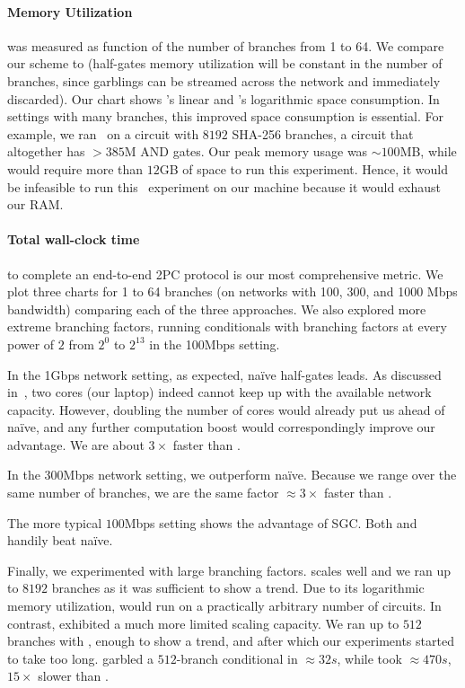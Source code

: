 \paragraph{Memory Utilization} was measured as function of the number
of branches from 1 to 64.
We compare our scheme to \stack (half-gates memory utilization will be
constant in the number of branches, since garblings
can be streamed across the network and immediately discarded).
%
Our chart shows \stack's linear and
\ourschemelong's logarithmic space consumption.
In settings with many branches, this improved space consumption
is essential.
For example, we ran \ourschemelong\ on a circuit
with $8192$ SHA-256 branches, a circuit that altogether has $> 385$M
AND gates.  Our peak memory usage was $\sim 100$MB, while \HK
would require more than $12$GB of space to run this experiment.
Hence, it would be
infeasible to run this \stack\ experiment on our machine because it
would exhaust our RAM.

\paragraph{Total wall-clock time} to complete an end-to-end 2PC
protocol is our most comprehensive metric.
We plot three charts for 1 to 64
branches (on networks with 100, 300, and 1000 Mbps bandwidth) comparing each of the three approaches.
We also explored more extreme branching factors, running conditionals with
branching factors at every power of $2$ from $2^0$ to $2^{13}$ in the 100Mbps setting.

In the 1Gbps network setting, as expected, na\"ive half-gates leads.
As discussed in~, two cores (our laptop) indeed
cannot keep up with the available network capacity.  However, doubling
the number of cores would already put us ahead of na\"ive, and any
further computation boost would correspondingly improve
our advantage.  We are about $3\times$ faster than \stack.

In the 300Mbps network setting, we outperform na\"ive.  Because we
range over the same number of branches, we are the same
factor $\approx 3\times$ faster than \stack.

The more typical $100$Mbps setting shows the advantage of SGC.
Both \stack and \ourschemelong handily beat na\"ive.

Finally, we experimented with large branching factors.
\ourschemelong scales well and we ran up to $8192$ branches as it
was sufficient to show a trend.  Due to its logarithmic memory
utilization, \ourschemelong would run on a practically
arbitrary number of circuits.  In contrast, \stack exhibited a much
more limited scaling capacity.  We ran up to $512$ branches with
\stack, enough to show a trend, and after which our experiments
started to take too long.   \ourschemelong garbled a
$512$-branch conditional in $\approx 32s$, while \stack took $\approx
470s$,  $15\times$ slower than \ourschemelong.


